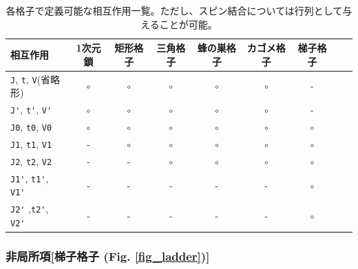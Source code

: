 \begin{table}[hbp]
  \begin{tabular}{|l||c|c|c|c|c|c|c|c|} \hline
    相互作用 & 1次元鎖 & 矩形格子 & 三角格子 & 蜂の巣格子 & カゴメ格子 & 梯子格子\\ 
    \hline \hline
     \verb|J|, \verb|t|, \verb|V|(省略形) & $\circ$	 & $\circ$ & $\circ$ & $\circ$ & $\circ$ & -\\ 
     \hline
    \verb|J'|, \verb|t'|, \verb|V'| & $\circ$	 & $\circ$	& $\circ$ 	& $\circ$ 	& $\circ$ & - \\ 
    \hline
    \verb|J0|, \verb|t0|, \verb|V0| & $\circ$  & $\circ$ 	& $\circ$ 	& $\circ$ 	& $\circ$ & $\circ$\\ 
    \hline
    \verb|J1|, \verb|t1|, \verb|V1| & -         	 & $\circ$ 	& $\circ$ 	& $\circ$ 	& $\circ$ & $\circ$\\ 
    \hline
    \verb|J2|, \verb|t2|, \verb|V2|  & -         	 & -    	& $\circ$ 	& $\circ$ 	& $\circ$ & $\circ$\\
    \hline
    \verb|J1'|, \verb|t1'|, \verb|V1'| & -		 &-	 	& -		& -		& -		& $\circ$\\
    \hline
    \verb|J2'| ,\verb|t2'|, \verb|V2'|  & -		 &-	 	& -		& -		& -		& $\circ$\\ 
    \hline
\end{tabular}
   \caption{各格子で定義可能な相互作用一覧。ただし、スピン結合については行列として与えることが可能。}
    \label{table_interactions}
\end{table}

\subsubsection{非局所項[梯子格子 (Fig. \ref{fig_ladder})]}


